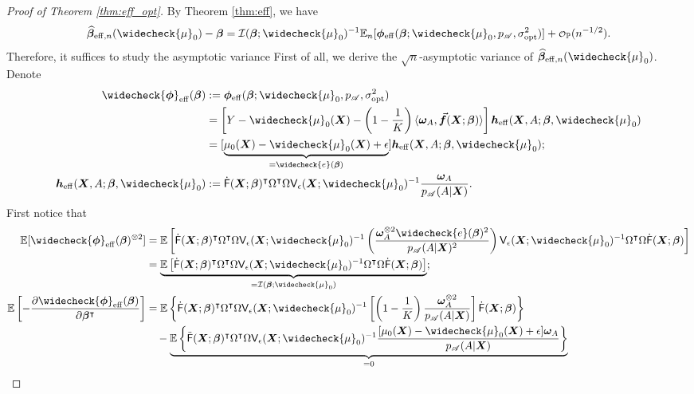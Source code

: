 \documentclass[11pt]{article}
\numberwithin{equation}{section}
\theoremstyle{definition}
\theoremstyle{remark}
\newcommand{\bbf}{\bm{f}}
\newcommand{\bh}{\bm{h}}
\newcommand{\bX}{\bm{X}}
\newcommand{\bbeta}{\bm{\beta}}
\newcommand{\bomega}{\bm{\omega}}
\newcommand{\bphi}{\bm{\phi}}
\newcommand{\bbE}{\mathbb{E}}
\newcommand{\bbP}{\mathbb{P}}
\newcommand{\cI}{\mathcal{I}}
\newcommand{\sA}{\mathscr{A}}
\newcommand{\sfF}{\mathsf{F}}
\newcommand{\sfV}{\mathsf{V}}
\newcommand\smallcO{
	\mathchoice
	{{\scriptstyle\mathcal{O}}}%
	{{\scriptstyle\mathcal{O}}}%
	{{\scriptscriptstyle\mathcal{O}}}%
	{\scalebox{.5}{$\scriptscriptstyle\mathcal{O}$}}%
}
\newcommand{\eff}{\mathrm{eff}}
\newcommand{\opt}{\mathrm{opt}}
\begin{document}
\begin{proof}[Proof of Theorem \ref{thm:eff_opt}]
	By Theorem \ref{thm:eff}, we have
	\[ \widehat{\bbeta}_{\eff,n}(\widecheck{\mu}_{0}) - \bbeta = \cI(\bbeta;\widecheck{\mu}_{0})^{-1}\bbE_{n}[\bphi_{\eff}(\bbeta;\widecheck{\mu}_{0},p_{\sA},\sigma_{\opt}^{2})] + \smallcO_{\bbP}(n^{-1/2}). \]
	Therefore, it suffices to study the asymptotic variance
	First of all, we derive the $ \sqrt{n} $-asymptotic variance of $ \widehat{\bbeta}_{\eff,n}(\widecheck{\mu}_{0}) $. Denote
	\begin{align*}
		\widecheck{\bphi}_{\eff}(\bbeta) &:= \bphi_{\eff}(\bbeta;\widecheck{\mu}_{0},p_{\sA},\sigma_{\opt}^{2})\\
		&= \left [Y - \widecheck{\mu}_{0}(\bX) - \left( 1 - {1 \over K} \right) \langle \bomega_{A},\vec{\bbf}(\bX;\bbeta) \rangle \right]\bh_{\eff}(\bX,A;\bbeta,\widecheck{\mu}_{0})\\
		&= [\underbrace{\mu_{0}(\bX) - \widecheck{\mu}_{0}(\bX) + \epsilon}_{=\widecheck{e}(\bbeta)}]\bh_{\eff}(\bX,A;\bbeta,\widecheck{\mu}_{0});\\
		\bh_{\eff}(\bX,A;\bbeta,\widecheck{\mu}_{0}) &:= \dot{\sfF}(\bX;\bbeta)^{\intercal}\Omega^{\intercal}\Omega\sfV_{\epsilon}(\bX;\widecheck{\mu}_{0})^{-1}{\bomega_{A} \over p_{\sA}(A|\bX)}.
	\end{align*}
	First notice that
	\begin{align*}
	\bbE[\widecheck{\bphi}_{\eff}(\bbeta)^{\otimes 2}] &= \bbE\left[ \dot{\sfF}(\bX;\bbeta)^{\intercal}\Omega^{\intercal}\Omega \sfV_{\epsilon}(\bX;\widecheck{\mu}_{0})^{-1}\left( {\bomega_{A}^{\otimes 2}\widecheck{e}(\bbeta)^{2} \over p_{\sA}(A|\bX)^{2}} \right)\sfV_{\epsilon}(\bX;\widecheck{\mu}_{0})^{-1} \Omega^{\intercal}\Omega\dot{\sfF}(\bX;\bbeta) \right]\\
	&=\underbrace{\bbE\left[ \dot{\sfF}(\bX;\bbeta)^{\intercal}\Omega^{\intercal}\Omega \sfV_{\epsilon}(\bX;\widecheck{\mu}_{0})^{-1} \Omega^{\intercal}\Omega\dot{\sfF}(\bX;\bbeta) \right]}_{= \cI(\bbeta;\widecheck{\mu}_{0})};\\
	\bbE\left[ -{\partial \widecheck{\bphi}_{\eff}(\bbeta) \over \partial \bbeta^{\intercal}} \right] &=\bbE\left\{ \dot{\sfF}(\bX;\bbeta)^{\intercal}\Omega^{\intercal}\Omega \sfV_{\epsilon}(\bX;\widecheck{\mu}_{0})^{-1} \left[ \left( 1 - {1 \over K} \right) {\bomega_{A}^{\otimes 2} \over p_{\sA}(A|\bX)} \right]\dot{\sfF}(\bX;\bbeta) \right\}\\
	& \quad - \underbrace{\bbE\left\{ \ddot{\sfF}(\bX;\bbeta)^{\intercal}\Omega^{\intercal}\Omega\sfV_{\epsilon}(\bX;\widecheck{\mu}_{0})^{-1}{[\mu_{0}(\bX) - \widecheck{\mu}_{0}(\bX) + \epsilon]\bomega_{A} \over p_{\sA}(A|\bX)} \right\}}_{= 0}\\

\end{align*}
\end{proof}
\end{document}
